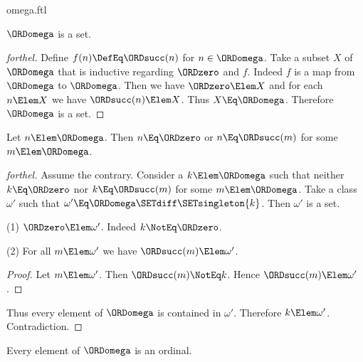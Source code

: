 \documentclass{stex}
\begin{document}
\begin{smodule}{omega.ftl}
\begin{corollary}[forthel]
  $\ORDomega$ is a set.
\end{corollary}
\begin{proof}[forthel]
  Define $f(n) \DefEq \ORDsucc(n)$ for $n \in \ORDomega$.
  Take a subset $X$ of $\ORDomega$ that is inductive regarding $\ORDzero$ and $f$.
  Indeed $f$ is a map from $\ORDomega$ to $\ORDomega$.
  Then we have $\ORDzero \Elem X$ and for each $n \Elem X$ we have $\ORDsucc(n) \Elem X$.
  Thus $X \Eq \ORDomega$.
  Therefore $\ORDomega$ is a set.
\end{proof}

\begin{proposition}[forthel]
  Let $n \Elem \ORDomega$.
  Then $n \Eq \ORDzero$ or $n \Eq \ORDsucc(m)$ for some $m \Elem \ORDomega$.
\end{proposition}
\begin{proof}[forthel]
  Assume the contrary.
  Consider a $k \Elem \ORDomega$ such that neither $k \Eq \ORDzero$ nor $k \Eq \ORDsucc(m)$ for
  some $m \Elem \ORDomega$.
  Take a class $\omega'$ such that $\omega' \Eq \ORDomega \SETdiff \SETsingleton{k}$. %
  Then $\omega'$ is a set.

  (1) $\ORDzero \Elem \omega'$.
  Indeed $k \NotEq \ORDzero$.

  (2) For all $m \Elem \omega'$ we have $\ORDsucc(m) \Elem \omega'$.
  \begin{proof}
    Let $m \Elem \omega'$.
    Then $\ORDsucc(m) \NotEq k$.
    Hence $\ORDsucc(m) \Elem \omega'$.
  \end{proof}

  Thus every element of $\ORDomega$ is contained in $\omega'$.
  Therefore $k \Elem \omega'$.
  Contradiction.
\end{proof}

\begin{proposition}[forthel]
  Every element of $\ORDomega$ is an ordinal.
\end{proposition}
\end{smodule}
\end{document}
